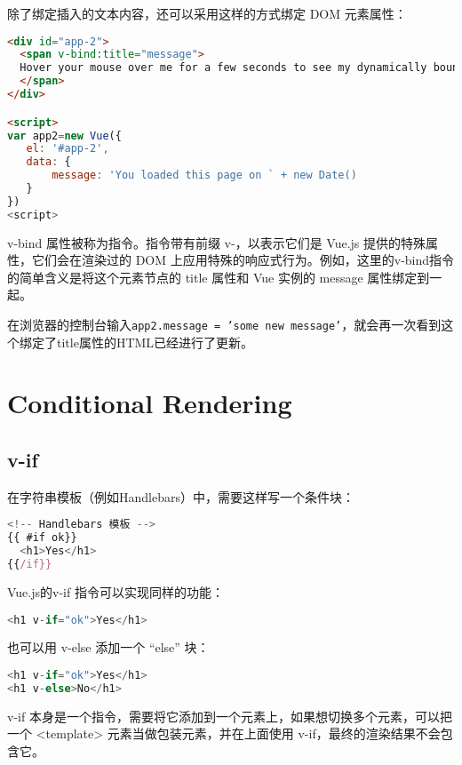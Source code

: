 除了绑定插入的文本内容，还可以采用这样的方式绑定 DOM 元素属性：


\begin{lstlisting}[language=HTML]
<div id="app-2">
  <span v-bind:title="message">
  Hover your mouse over me for a few seconds to see my dynamically bound title!
  </span>
</div>

<script>
var app2=new Vue({
   el: '#app-2',
   data: {
       message: 'You loaded this page on ` + new Date()
   }
})
<script>
\end{lstlisting}

v-bind 属性被称为指令。指令带有前缀 v-，以表示它们是 Vue.js 提供的特殊属性，它们会在渲染过的 DOM 上应用特殊的响应式行为。例如，这里的v-bind指令的简单含义是将这个元素节点的 title 属性和 Vue 实例的 message 属性绑定到一起。

在浏览器的控制台输入\texttt{app2.message = 'some new message'}，就会再一次看到这个绑定了title属性的HTML已经进行了更新。



\section{Conditional Rendering}

\subsection{v-if}

在字符串模板（例如Handlebars）中，需要这样写一个条件块：


\begin{lstlisting}[language=JavaScript]
<!-- Handlebars 模板 -->
{{ #if ok}}
  <h1>Yes</h1>
{{/if}}
\end{lstlisting}

Vue.js的v-if 指令可以实现同样的功能：

\begin{lstlisting}[language=JavaScript]
<h1 v-if="ok">Yes</h1>
\end{lstlisting}

也可以用 v-else 添加一个 “else” 块：

\begin{lstlisting}[language=JavaScript]
<h1 v-if="ok">Yes</h1>
<h1 v-else>No</h1>
\end{lstlisting}

v-if 本身是一个指令，需要将它添加到一个元素上，如果想切换多个元素，可以把一个 <template> 元素当做包装元素，并在上面使用 v-if，最终的渲染结果不会包含它。


